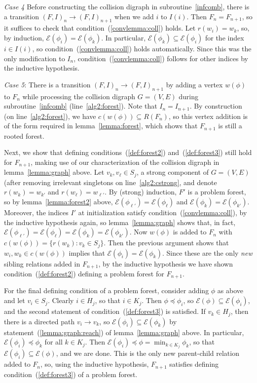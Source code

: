 \documentclass[11pt,reqno]{amsart}
\theoremstyle{definition}
\numberwithin{equation}{section}
\newcommand{\pre}{\phi}
\newcommand{\sub}{\subseteq}
\newcommand{\fix}{\mathcal{E}}
\newcommand{\peq}{\preceq}
\newcommand{\strongcomp}{S}
\newcommand{\coll}{I}
\newcommand{\reach}{H}
\newcommand{\forest}{F}
\newcommand{\pair}{(F,I)}
\newcommand{\roott}{R}
\begin{document}
\begin{enumerate}
\emph{Case 4} Before constructing the collision digraph in subroutine~\ref{infcomb}, there is a transition $\pair_n \to \pair_{n + 1}$ when we add $i$ to $\coll(i)$. 
Then $\forest_n = \forest_{n + 1}$, so it suffices to check that condition~(\ref{convlemma:coll}) holds. 
Let $r(w_i) = w_k$, so, by induction, $\fix(\pre_i) = \fix(\pre_k)$. 
In particular, $\fix(\pre_k) \sub \fix(\pre_i)$ for the index $i \in \coll(i)$, so condition~(\ref{convlemma:coll}) holds automatically.
Since this was the only modification to $\coll_n$, condition~(\ref{convlemma:coll}) follows for other indices by the inductive hypothesis.

\emph{Case 5}: There is a transition $\pair_n \to \pair_{n + 1}$ by adding a vertex $w(\pre)$ to $\forest_n$ while processing the collision digraph $G = (V,E)$ during subroutine~\ref{infcomb} (line~\ref{alg2:forest}).
Note that $\coll_n = \coll_{n + 1}$. 
By construction (on line~\ref{alg2:forest}), we have $c(w(\pre)) \sub \roott(\forest_n)$, so this vertex addition is of the form required in lemma~\ref{lemma:forest}, which shows that $\forest_{n + 1}$ is still a rooted forest.  

Next, we show that defining conditions~(\ref{def:forest2}) and~(\ref{def:forest3}) still hold for $\forest_{n + 1}$, making use of our characterization of the collision digraph in lemma~\ref{lemma:graph} above.
Let $v_k, v_{\ell} \in \strongcomp_j$, a strong component of $G = (V,E)$ (after removing irrelevant singletons on line~\ref{alg2:cstrong}, and denote $r(w_k) = w_{k'}$ and $r(w_{\ell}) = w_{\ell'}$.
By (strong) induction, $\forest'$ is a problem forest, so by lemma~\ref{lemma:forest2} above, $\fix(\pre_{\ell'}) = \fix(\pre_{\ell})$ and $\fix(\pre_k) = \fix(\pre_{k'})$. 
Moreover, the indices $\coll'$ at initialization satisfy condition~(\ref{convlemma:coll}), by the inductive hypothesis again, so lemma~\ref{lemma:graph} shows that, in fact, $\fix(\pre_{\ell'}) = \fix(\pre_{\ell}) = \fix(\pre_k) = \fix(\pre_{k'})$. 
Now $w(\pre)$ is added to $\forest_n$ with $c(w(\pre)) = \{r(w_k):v_k \in \strongcomp_j\}$. 
Then the previous argument shows that $w_i,w_k \in c(w(\pre))$ implies that $\fix(\pre_i) = \fix(\pre_k)$. 
Since these are the only \emph{new} sibling relations added in $\forest_{n+1}$, by the inductive hypothesis we have shown condition~(\ref{def:forest2}) defining a problem forest for $\forest_{n+1}$. 

For the final defining condition of a problem forest, consider adding $\pre$ as above and let $v_i \in \strongcomp_j$. 
Clearly $i \in \reach_j$, so that $i \in K_j$. 
Then $\pre \peq \pre_i$, so $\fix(\pre) \sub \fix(\pre_i)$, and the second statement of condition~(\ref{def:forest3}) is satisfied. 
If $v_k \in \reach_j$, then there is a directed path $v_i \to v_k$, so $\fix(\pre_i) \sub \fix(\pre_k)$ by statement~(\ref{lemma:graph:reach}) of lemma~\ref{lemma:graph} above.
In particular, $\fix(\pre_i) \peq \pre_k$ for all $k \in K_j$. 
Then $\fix(\pre_i) \peq \pre = \min_{k \in K_j} \pre_k$, so that $\fix(\pre_i) \sub \fix(\pre)$, and we are done. 
This is the only new parent-child relation added to $\forest_n$, so, using the inductive hypothesis, $\forest_{n+1}$ satisfies defining condition~(\ref{def:forest3}) of a problem forest. 


\end{enumerate}
\end{document}
